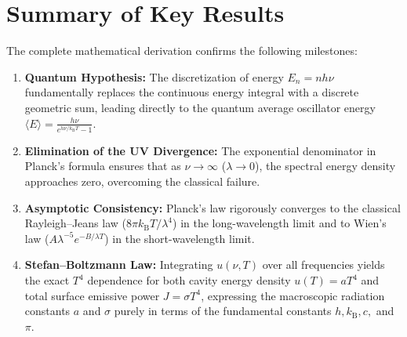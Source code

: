 \documentclass[11pt,a4paper]{article}
\newcommand{\kB}{k_{\mathrm{B}}}
\newcommand{\avgE}{\langle E \rangle}
\begin{document}
\section{Summary of Key Results}

The complete mathematical derivation confirms the following milestones:
\begin{enumerate}
    \item \textbf{Quantum Hypothesis:} The discretization of energy $E_n = nh\nu$ fundamentally replaces the continuous energy integral with a discrete geometric sum, leading directly to the quantum average oscillator energy $\avgE = \frac{h\nu}{e^{h\nu/\kB T} - 1}$.
    \item \textbf{Elimination of the UV Divergence:} The exponential denominator in Planck's formula ensures that as $\nu \to \infty$ ($\lambda \to 0$), the spectral energy density approaches zero, overcoming the classical failure.
    \item \textbf{Asymptotic Consistency:} Planck's law rigorously converges to the classical Rayleigh--Jeans law ($8\pi \kB T / \lambda^4$) in the long-wavelength limit and to Wien's law ($A\lambda^{-5} e^{-B/\lambda T}$) in the short-wavelength limit.
    \item \textbf{Stefan--Boltzmann Law:} Integrating $u(\nu, T)$ over all frequencies yields the exact $T^4$ dependence for both cavity energy density $u(T) = a T^4$ and total surface emissive power $J = \sigma T^4$, expressing the macroscopic radiation constants $a$ and $\sigma$ purely in terms of the fundamental constants $h, \kB, c,$ and $\pi$.
\end{enumerate}
\end{document}
